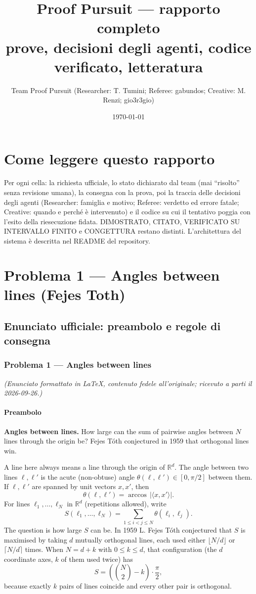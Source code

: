 \documentclass[11pt,a4paper]{article}
\title{Proof Pursuit --- rapporto completo\\ \large prove, decisioni degli agenti, codice verificato, letteratura}
\author{Team Proof Pursuit (Researcher: T. Tumini; Referee: gabundos; Creative: M. Renzi; gio3r3gio)}
\date{\today}
\begin{document}
\maketitle\tableofcontents
\section*{Come leggere questo rapporto}
Per ogni cella: la richiesta ufficiale, lo stato dichiarato dal team (mai ``risolto'' senza revisione umana), la consegna
con la prova, poi la traccia delle decisioni degli agenti (Researcher: famiglia e motivo; Referee: verdetto ed errore
fatale; Creative: quando e perché è intervenuto) e il codice su cui il tentativo poggia con l'esito della riesecuzione
fidata. DIMOSTRATO, CITATO, VERIFICATO SU INTERVALLO FINITO e CONGETTURA restano distinti. L'architettura del sistema
è descritta nel README del repository.
\section{Problema 1 — Angles between lines (Fejes Toth)}
\subsection{Enunciato ufficiale: preambolo e regole di consegna}
\subsubsection{Problema 1 --- Angles between
lines}\label{problema-1-angles-between-lines}

\emph{(Enunciato formattato in LaTeX, contenuto fedele all'originale;
ricevuto a parti il 2026-09-26.)}

\paragraph{Preambolo}\label{preambolo}

\textbf{Angles between lines.} How large can the sum of pairwise angles
between \(N\) lines through the origin be? Fejes Tóth conjectured in
1959 that orthogonal lines win.

A line here always means a line through the origin of \(\mathbb{R}^d\).
The angle between two lines \(\ell, \ell'\) is the acute (non-obtuse)
angle \(\theta(\ell,\ell') \in [0,\pi/2]\) between them. If
\(\ell, \ell'\) are spanned by unit vectors \(x, x'\), then \[
\theta(\ell,\ell') = \arccos\,\lvert \langle x, x' \rangle \rvert .
\] For lines \(\ell_1, \ldots, \ell_N\) in \(\mathbb{R}^d\) (repetitions
allowed), write \[
S(\ell_1,\ldots,\ell_N) = \sum_{1 \le i < j \le N} \theta(\ell_i,\ell_j).
\] The question is how large \(S\) can be. In 1959 L. Fejes Tóth
conjectured that \(S\) is maximised by taking \(d\) mutually orthogonal
lines, each used either \(\lfloor N/d \rfloor\) or \(\lceil N/d \rceil\)
times. When \(N = d + k\) with \(0 \le k \le d\), that configuration
(the \(d\) coordinate axes, \(k\) of them used twice) has \[
S = \left( \binom{N}{2} - k \right) \cdot \frac{\pi}{2},
\] because exactly \(k\) pairs of lines coincide and every other pair is
orthogonal.
\end{document}
